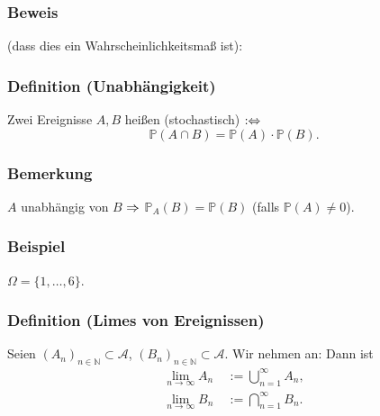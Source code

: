 \subsubsection{Beweis}
(dass dies ein Wahrscheinlichkeitsma\ss{} ist):
\subsubsection{Definition (Unabh\"angigkeit)}
Zwei Ereignisse $A,B$ hei\ss{}en (stochastisch)  $:\Leftrightarrow$
\[
\mathbb{P}(A\cap B)=\mathbb{P}(A)\cdot\mathbb{P}(B).
\]
\subsubsection{Bemerkung}
$A$ unabh\"angig von $B$ $\Rightarrow$ $\mathbb{P}_A(B)=\mathbb{P}(B)$ (falls $\mathbb{P}(A)\neq0$).
\subsubsection{Beispiel}
$\Omega=\{1,\ldots,6\}$.
\subsubsection{Definition (Limes von Ereignissen)}
Seien $(A_n)_{n\in\mathbb{N}}\subset\mathcal{A}$, $(B_n)_{n\in\mathbb{N}}\subset\mathcal{A}$.
Wir nehmen an:
Dann ist
\begin{align*}
    \lim_{n\to\infty}A_n&\ :=\bigcup_{n=1}^\infty A_n,\\
    \lim_{n\to\infty}B_n&\ :=\bigcap_{n=1}^\infty B_n.
\end{align*}
